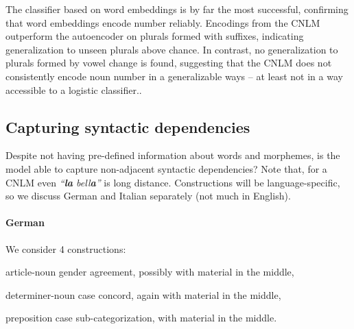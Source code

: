 The classifier based on word embeddings is by far the most successful, confirming that word embeddings encode number reliably.
Encodings from the CNLM outperform the autoencoder on plurals formed with suffixes, indicating generalization to unseen plurals above chance.
In contrast, no generalization to plurals formed by vowel change is found, suggesting that the CNLM does not consistently encode noun number in a generalizable ways -- at least not in a way accessible to a logistic classifier..


\subsection{Capturing syntactic dependencies}
\label{sec:dependencies}

Despite not having pre-defined information about words and morphemes,
is the model able to capture non-adjacent syntactic dependencies?
Note that, for a CNLM even \emph{``\textbf{la} bell\textbf{a}''} is long
distance.
Constructions will be language-specific, so we discuss
German and Italian separately (not much in English).


\paragraph{German} We consider 4 constructions:
\begin{inparaenum}[i)]
\item article-noun gender agreement, possibly with material in the middle,
\item determiner-noun case concord, again with material in the middle,
\item preposition case sub-categorization, with material in the middle.
\end{inparaenum}


